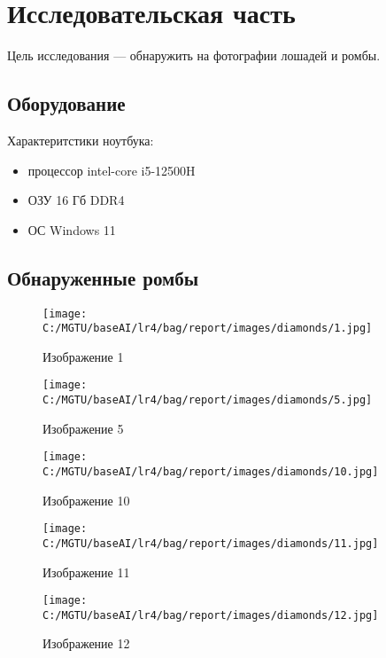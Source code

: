 \chapter{Исследовательская часть}

Цель исследования — обнаружить на фотографии лошадей и ромбы.

\section{Оборудование}

Характеритстики ноутбука:
\begin{itemize}
	\item процессор intel-core i5-12500H \cite{lib:intel}
	\item ОЗУ 16 Гб DDR4
	\item ОС Windows 11 \cite{lib:windows}
\end{itemize}

\section{Обнаруженные ромбы}

\begin{figure}[H]
    \centering
    \texttt{[image: C:/MGTU/baseAI/lr4/bag/report/images/diamonds/1.jpg]}
    \caption{Изображение 1}
\end{figure}

\begin{figure}[H]
    \centering
    \texttt{[image: C:/MGTU/baseAI/lr4/bag/report/images/diamonds/5.jpg]}
    \caption{Изображение 5}
\end{figure}

\begin{figure}[H]
    \centering
    \texttt{[image: C:/MGTU/baseAI/lr4/bag/report/images/diamonds/10.jpg]}
    \caption{Изображение 10}
\end{figure}

\begin{figure}[H]
    \centering
    \texttt{[image: C:/MGTU/baseAI/lr4/bag/report/images/diamonds/11.jpg]}
    \caption{Изображение 11}
\end{figure}

\begin{figure}[H]
    \centering
    \texttt{[image: C:/MGTU/baseAI/lr4/bag/report/images/diamonds/12.jpg]}
    \caption{Изображение 12}
\end{figure}

